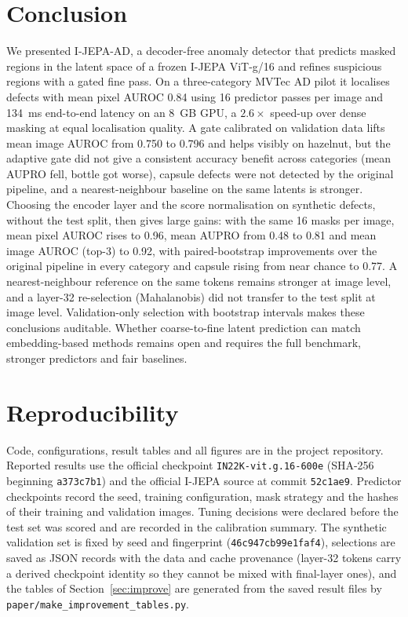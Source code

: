 \documentclass[conference]{IEEEtran}
\begin{document}
\section{Conclusion}
We presented I-JEPA-AD, a decoder-free anomaly detector that predicts masked regions in the latent space of a frozen I-JEPA ViT-g/16 and refines suspicious regions with a gated fine pass. On a three-category MVTec AD pilot it localises defects with mean pixel AUROC 0.84 using 16 predictor passes per image and 134~ms end-to-end latency on an 8~GB GPU, a $2.6\times$ speed-up over dense masking at equal localisation quality. A gate calibrated on validation data lifts mean image AUROC from 0.750 to 0.796 and helps visibly on hazelnut, but the adaptive gate did not give a consistent accuracy benefit across categories (mean AUPRO fell, bottle got worse), capsule defects were not detected by the original pipeline, and a nearest-neighbour baseline on the same latents is stronger. Choosing the encoder layer and the score normalisation on synthetic defects, without the test split, then gives large gains: with the same 16 masks per image, mean pixel AUROC rises to 0.96, mean AUPRO from 0.48 to 0.81 and mean image AUROC (top-3) to 0.92, with paired-bootstrap improvements over the original pipeline in every category and capsule rising from near chance to 0.77. A nearest-neighbour reference on the same tokens remains stronger at image level, and a layer-32 re-selection (Mahalanobis) did not transfer to the test split at image level. Validation-only selection with bootstrap intervals makes these conclusions auditable. Whether coarse-to-fine latent prediction can match embedding-based methods remains open and requires the full benchmark, stronger predictors and fair baselines.

\section*{Reproducibility}
Code, configurations, result tables and all figures are in the project repository. Reported results use the official checkpoint \texttt{IN22K-vit.g.16-600e} (SHA-256 beginning \texttt{a373c7b1}) and the official I-JEPA source at commit \texttt{52c1ae9}. Predictor checkpoints record the seed, training configuration, mask strategy and the hashes of their training and validation images. Tuning decisions were declared before the test set was scored and are recorded in the calibration summary. The synthetic validation set is fixed by seed and fingerprint (\texttt{46c947cb99e1faf4}), selections are saved as JSON records with the data and cache provenance (layer-32 tokens carry a derived checkpoint identity so they cannot be mixed with final-layer ones), and the tables of Section~\ref{sec:improve} are generated from the saved result files by \texttt{paper/make\_improvement\_tables.py}.
\end{document}
